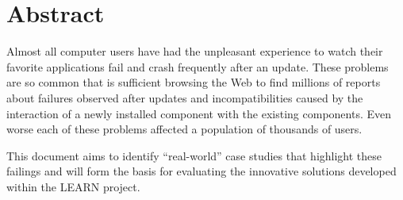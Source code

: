 \documentclass[a4paper,oneside]{scrreprt}
\begin{document}
\section*{Abstract}
Almost all computer users have had the unpleasant experience to watch their
favorite applications fail and crash frequently after an update. These
problems are so common that is sufficient browsing the Web to find millions of reports
about failures observed after updates and incompatibilities caused by the
interaction of a newly installed component with the existing components. Even
worse each of these problems affected a population of thousands of users.

This document aims to identify ``real-world'' case studies
that highlight these failings and will form the basis for evaluating the
innovative solutions developed within the LEARN project.  




\begin{versionhistory}  

 
\end{versionhistory}


\tableofcontents
\cleardoublepage











\printnoidxglossaries


\end{document}
